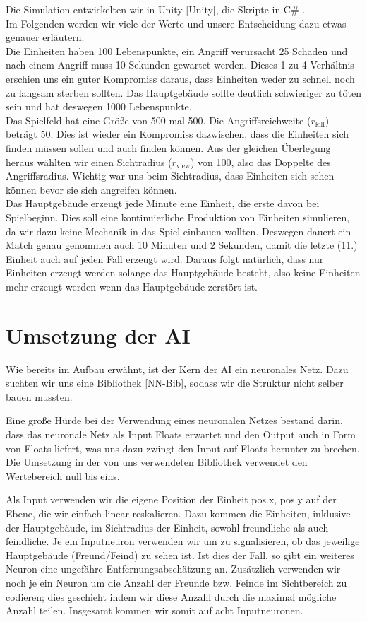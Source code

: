 \documentclass[
	12pt,
	a4paper,
	BCOR10mm,
	DIV14,
	headsepline,
	usegeometry,
]{scrreprt}
\begin{document}
Die Simulation entwickelten wir in Unity [Unity], die Skripte in C\# .\\
Im Folgenden werden wir viele der Werte und unsere Entscheidung dazu etwas genauer erläutern.\\
Die Einheiten haben 100 Lebenspunkte, ein Angriff verursacht 25 Schaden und nach einem Angriff muss 10 Sekunden gewartet werden. Dieses 1-zu-4-Verhältnis erschien uns ein guter Kompromiss daraus, dass Einheiten weder zu schnell noch zu langsam sterben sollten. Das Hauptgebäude sollte deutlich schwieriger zu töten sein und hat deswegen 1000 Lebenspunkte.\\
Das Spielfeld hat eine Größe von 500 mal 500. Die Angriffsreichweite ($r_{\text{kill}}$) beträgt 50. Dies ist wieder ein Kompromiss dazwischen, dass die Einheiten sich finden müssen sollen und auch finden können. Aus der gleichen Überlegung heraus wählten wir einen Sichtradius ($r_{\text{view}}$) von 100, also das Doppelte des Angriffsradius. Wichtig war uns beim Sichtradius, dass Einheiten sich sehen können bevor sie sich angreifen können.\\
Das Hauptgebäude erzeugt jede Minute eine Einheit, die erste davon bei Spielbeginn. Dies soll eine kontinuierliche Produktion von Einheiten simulieren, da wir dazu keine Mechanik in das Spiel einbauen wollten. Deswegen dauert ein Match genau genommen auch 10 Minuten und 2 Sekunden, damit die letzte (11.) Einheit auch auf jeden Fall erzeugt wird. Daraus folgt natürlich, dass nur Einheiten erzeugt werden solange das Hauptgebäude besteht, also keine Einheiten mehr erzeugt werden wenn das Hauptgebäude zerstört ist.


\section{Umsetzung der AI}
Wie bereits im Aufbau erwähnt, ist der Kern der AI ein neuronales Netz.
Dazu suchten wir uns eine Bibliothek [NN-Bib], sodass wir die Struktur nicht selber bauen mussten.

Eine große Hürde bei der Verwendung eines neuronalen Netzes bestand darin, dass das neuronale Netz als Input Floats erwartet und den Output auch in Form von Floats liefert, was uns dazu zwingt den Input auf Floats herunter zu brechen.
Die Umsetzung in der von uns verwendeten Bibliothek verwendet den Wertebereich null bis eins.

Als Input verwenden wir die eigene Position der Einheit pos.x, pos.y auf der Ebene, die wir einfach linear reskalieren.
Dazu kommen die Einheiten, inklusive der Hauptgebäude, im Sichtradius der Einheit, sowohl freundliche als auch feindliche.
Je ein Inputneuron verwenden wir um zu signalisieren, ob das jeweilige Hauptgebäude (Freund/Feind) zu sehen ist.
Ist dies der Fall, so gibt ein weiteres Neuron eine ungefähre Entfernungsabschätzung an.
Zusätzlich verwenden wir noch je ein Neuron um die Anzahl der Freunde bzw. Feinde im Sichtbereich zu codieren; dies geschieht indem wir diese Anzahl durch die maximal mögliche Anzahl teilen.
Insgesamt kommen wir somit auf acht Inputneuronen.
\end{document}
